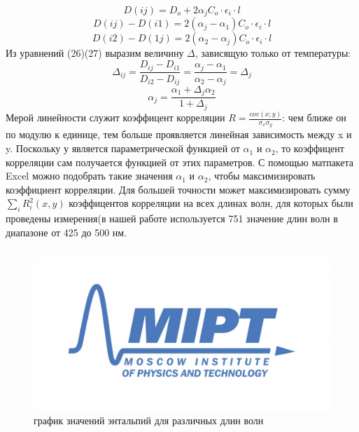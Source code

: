 \documentclass[a4paper,12pt]{article} %
\begin{document}
\begin{equation}
D(ij) =D_o + 2\alpha_jC_o \cdot \epsilon_i \cdot l
\end{equation}
\begin{equation}
D(ij) - D(i1) =2(\alpha_j - \alpha_1)C_o \cdot \epsilon_i\cdot l
\end{equation}
\begin{equation}
D(i2) - D(1j) =2( \alpha_2 - \alpha_j)C_o \cdot \epsilon_i \cdot l
\end{equation}
Из уравнений (26)(27) выразим величину $\Delta$, зависящую только от температуры:
\begin{equation}
\Delta_{ij} = \frac{D_{ij} - D_{i1}}{D_{i2} - D_{ij}} = \frac{\alpha_{j} - \alpha_{1}}{\alpha_{2} - \alpha_{j}} = \Delta_{j}
\end{equation}
\begin{equation}
\alpha_j = \frac{\alpha_1 + \Delta_{j}\alpha_2}{1 + \Delta_{j}}
\end{equation}
Мерой линейности служит коэффицент корреляции $R = \frac{cov(x;y)}{\sigma_x\sigma_y}$: чем ближе он по модулю к единице, тем больше проявляется линейная зависимость между  x и y. Поскольку у является параметрической функцией от $\alpha_1$ и $\alpha_2$, то коэффицент корреляции сам получается функцией от этих параметров. С помощью матпакета Excel можно подобрать такие значения $\alpha_1$ и $\alpha_2$, чтобы максимизировать коэффициент корреляции. Для большей точности может максимизировать сумму $\sum_{i}R_i^2(x, y)$ коэффицентов корреляции на всех длинах волн, для которых были проведены измерения(в нашей работе используется 751 значение длин волн в диапазоне от 425 до 500 нм.


\begin{figure}[h!]
\begin{center}
\includegraphics[width=1.0\textwidth]{Images/logo.jpg}
\end{center}
\caption{график значений энтальпий для различных длин волн} \label{dz1}
\end{figure}
\end{document}
